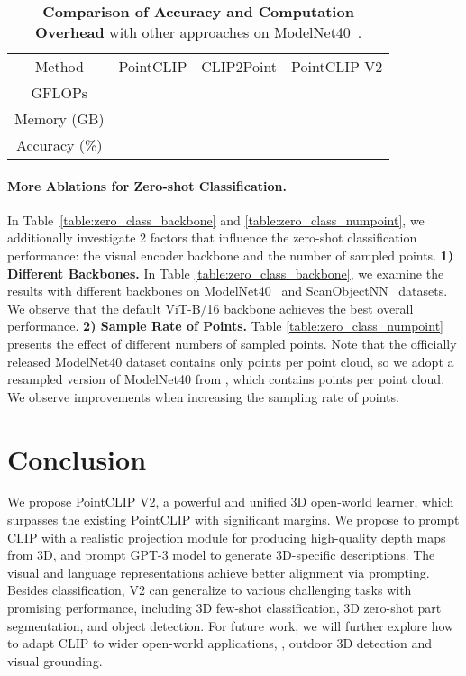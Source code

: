 \documentclass[10pt,twocolumn,letterpaper]{article}
\begin{document}
\begin{table}[t!]
\centering
\begin{adjustbox}{width=0.93\linewidth}
	\begin{tabular}{c c c c }
	\toprule
	\multirow{1}{*}{Method} &\multicolumn{1}{c}{PointCLIP} &\multicolumn{1}{c}{CLIP2Point} &\multicolumn{1}{c}{PointCLIP V2}\\
	\cmidrule(lr){1-1} \cmidrule(lr){2-2} \cmidrule(lr){3-3} \cmidrule(lr){4-4}
	GFLOPs &  &  & \\
        Memory (GB) &  &  & \\
        Accuracy (\%) &  &  & \\
	\bottomrule
	\end{tabular}
\end{adjustbox}
\vspace{0.3cm}
\caption{\textbf{Comparison of Accuracy and Computation Overhead} with other approaches on ModelNet40~\cite{wu20153d}. }
\label{tab:computation_burden}
\end{table}

\paragraph{More Ablations for Zero-shot Classification.}
\label{abzero}
In Table~\ref{table:zero_class_backbone} and \ref{table:zero_class_numpoint}, we additionally investigate 2 factors that influence the zero-shot classification performance: the visual encoder backbone and the number of sampled points. 
\textbf{1) Different Backbones.}
In Table \ref{table:zero_class_backbone}, we examine the results with different backbones on ModelNet40~\cite{wu20153d} and ScanObjectNN~\cite{uy2019revisiting} datasets. We observe that the default ViT-B/16 backbone achieves the best overall performance. 
\textbf{2) Sample Rate of Points.}
Table \ref{table:zero_class_numpoint} presents the effect of different numbers of sampled points. Note that the officially released ModelNet40 dataset contains only  points per point cloud, so we adopt a resampled version of ModelNet40 from \cite{wang2022p2p}, which contains  points per point cloud. We observe improvements when increasing the sampling rate of points. 


\section{Conclusion}
\label{sec:conclusion}

We propose PointCLIP V2, a powerful and unified 3D open-world learner, which surpasses the existing PointCLIP with significant margins. We propose to prompt CLIP with a realistic projection module for producing high-quality depth maps from 3D, and prompt GPT-3 model to generate 3D-specific descriptions. The visual and language representations achieve better alignment via prompting. Besides classification, V2 can generalize to various challenging tasks with promising performance, including 3D few-shot classification, 3D zero-shot part segmentation, and object detection. For future work, we will further explore how to adapt CLIP to wider open-world applications, \eg, outdoor 3D detection and visual grounding.
\end{document}
